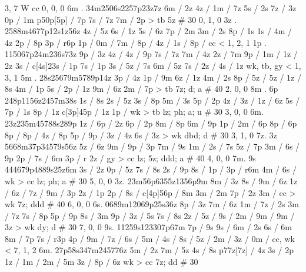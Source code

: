 3, 7
W
cc
0, 0, 0
6m . 
34m2506s2257p23z7z 
6m / 2z 
4z / 
1m / 7z 
5s / 2s 
7z / 3z 
0p / 1m 
p50p[5p] / 7p 
7s / 7z 
7m / 2p 
> tb 
5z # 30 
%
0, 1, 0 
3z .  
2588m4677p12s1z56z 
4z / 5z 
6s / 1z 
5s / 6z 
7p / 2m 
3m / 2s 
8p / 1s 
1s / 
4m / 4z 
2p / 8p 
3p / r6p 
1p / 
0m / 
7m / 
8p / 
4z / 
1s / 
8p / 
cc < 
%
1, 2, 1 
1p . 
115067p24m236s73z 
9p / 3z 
4z / 
4z / 9p
7s / 7z 
7m / 4z 
2z / 7m 
9p / 
1m / 
1z / 2z 
3s / 
c[4s]23s / 1p 
7s / 1p 
3s / 
5z / 7s 
6m / 5z 
7s / 
2z / 
4s / 1z 
wk, tb, gy < 
%
1, 3, 1
5m . 
28s25679m5789p14z 
3p / 4z 
1p / 9m 
6z / 1z 
4m / 2s 
8p / 
5z / 
5z / 
1z / 8s 
4m / 1p 
5s / 
2p / 1z 
9m / 6z 
2m / 7p
> tb 
7z; d; a # 40
%
2, 0, 0
8m . 6p
248p1156z2457m38s 
1s / 8s 
2s / 5z 
3s / 8p 
5m / 3s 
5p / 2p 
4z / 
3z / 
1z / 6z 
5s / 
7p / 1s 
8p / 1z 
c[3p]45p / 1z 
1p / 
wk > tb 
lz; ph; a; u # 30 
% 
3, 0, 0
6m. 
23z235m45788s289p 
1z / 
6p / 2z 
6p / 2p 
8m / 8p 
6m / 9p 
1p / 
2m / 6p 
8p / 6p 
8p / 
8p / 
4z / 8p 
5p /  
9p / 
3z / 4z 
6s / 3z 
> wk 
dbd; d # 30
%
3, 1, 0
7z. 3z
5668m37p34579s56z 
5z / 6z 
9m / 
9p / 3p 
7m / 9s 
1m / 
2s / 7s 
5z / 7p 
3m / 
6s / 9p 
2p / 
7s / 6m 
3p / r 
2z / 
gy > cc 
lz; 5z; ddd; a # 40
%
4, 0, 0
7m. 9s
444679p4889s25z6m 
3s / 2z 
0p / 5z 
7s / 8s 
2s / 9p 
8s / 
1p / 
3p / r6m 
4m / 
6s / 
wk > cc 
lz; ph; a # 30
%
5, 0, 0 
3z.
23m56p6355z1356p9m 
8m / 3z 
8s /
9m / 6z 
1z / 
6z / 
7z / 
9m / 3p 
2z / 1p 
2p /
8s /
c[4p]56p / 8m 
3m / 2m 
7p / 2z 
3m / 
cc > wk 
7z; ddd # 40 
% 
6, 0, 0 
6s. 
0689m12069p25s36z 
8p / 3z 
7m / 6z 
1m / 
7z / 2s
3m / 7z 
7s / 8p 
5p / 9p 
8s / 3m 
9p / 
3z / 5s 
7s / 8s 
2z / 
5z / 
9s / 
2m / 
9m / 
9m / 3z 
> wk 
dy; d # 30
% 
7, 0, 0
9s. 
11259s123307p67m
7p / 9s
9s / 
6m / 2s 
6s / 6m 
8m / 7p 
7s / r3p 
4p / 
9m / 
7z / 
6s /
5m /
4s /
8s /
5z /
2m /
3z /
0m /
cc, wk <
7, 1, 2
6m. 
27p58s347m245776z 
5m / 2z 
7m / 5z 
4s / 8s 
p77z[7z] / 4z 
3s / 2p 
1z / 
1m / 
2m / 5m 
3z /
8p / 6z
wk > cc 
7z; dd # 30